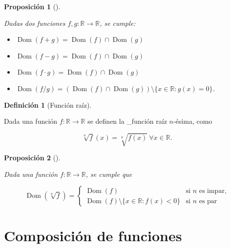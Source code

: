 \documentclass[
  a4paper,
]{scrreport}
\providecommand{\tightlist}{%
  \setlength{\itemsep}{0pt}\setlength{\parskip}{0pt}}\usepackage{longtable,booktabs,array}
\theoremstyle{definition}
\theoremstyle{plain}
\theoremstyle{definition}
\newtheorem{definition}{Definición}[chapter]
\theoremstyle{definition}
\theoremstyle{plain}
\theoremstyle{plain}
\newtheorem{proposition}{Proposición}[chapter]
\theoremstyle{remark}
\begin{document}
\begin{proposition}[]\protect\hypertarget{prp-dominio-funcion-suma-resta-producto-cociente}{}\label{prp-dominio-funcion-suma-resta-producto-cociente}

Dadas dos funciones \(f,g: \mathbb{R}\rightarrow \mathbb{R}\), se
cumple:

\begin{itemize}
\tightlist
\item
  \(\operatorname{Dom}(f+g)=\operatorname{Dom}(f)\cap \operatorname{Dom}(g)\)
\item
  \(\operatorname{Dom}(f-g)=\operatorname{Dom}(f)\cap \operatorname{Dom}(g)\)
\item
  \(\operatorname{Dom}(f\cdot g)=\operatorname{Dom}(f)\cap \operatorname{Dom}(g)\)
\item
  \(\operatorname{Dom}(f/g)=(\operatorname{Dom}(f)\cap \operatorname{Dom}(g))\setminus \{x\in \mathbb{R}: g(x)=0\}\).
\end{itemize}

\end{proposition}

\begin{definition}[Función
raíz]\protect\hypertarget{def-funcion-raiz}{}\label{def-funcion-raiz}

Dada una función \(f: \mathbb{R}\rightarrow \mathbb{R}\) se definen la
\_función raíz \(n\)-ésima, como

\[
\sqrt[n]{f}(x) = \sqrt[n]{f(x)}\ \forall x \in \mathbb{R}.
\]

\end{definition}

\begin{proposition}[]\protect\hypertarget{prp-dominio-funcion-raiz}{}\label{prp-dominio-funcion-raiz}

Dada una función \(f: \mathbb{R}\rightarrow \mathbb{R}\), se cumple que

\[
\operatorname{Dom}(\sqrt[n]{f})=
\begin{cases}
\operatorname{Dom}(f) & \mbox{si $n$ es impar,}\\ 
\operatorname{Dom}(f)\setminus\{x\in\mathbb{R}: f(x)<0\} & \mbox{si $n$ es par}
\end{cases}
\]

\end{proposition}

\section{Composición de funciones}\label{composiciuxf3n-de-funciones-1}
\end{document}
